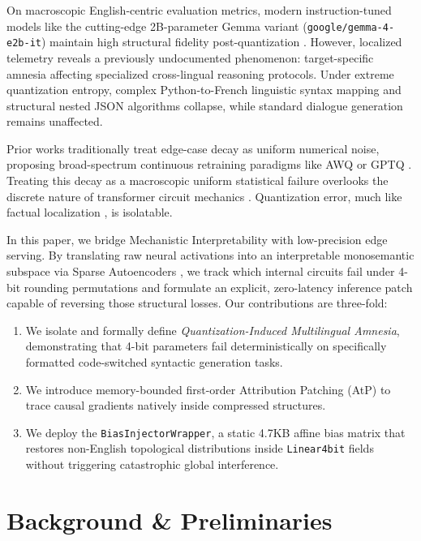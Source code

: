 \documentclass{article}
\begin{document}
On macroscopic English-centric evaluation metrics, modern instruction-tuned models like the cutting-edge 2B-parameter Gemma variant (\texttt{google/gemma-4-e2b-it}) maintain high structural fidelity post-quantization \cite{gemma2024gemma, touvron2023llama}. However, localized telemetry reveals a previously undocumented phenomenon: target-specific amnesia affecting specialized cross-lingual reasoning protocols. Under extreme quantization entropy, complex Python-to-French linguistic syntax mapping and structural nested JSON algorithms collapse, while standard dialogue generation remains unaffected.

Prior works traditionally treat edge-case decay as uniform numerical noise, proposing broad-spectrum continuous retraining paradigms like AWQ \cite{lin2023awq} or GPTQ \cite{frantar2022gptq}. Treating this decay as a macroscopic uniform statistical failure overlooks the discrete nature of transformer circuit mechanics \cite{elhage2021mathematical, olah2020zoom}. Quantization error, much like factual localization \cite{meng2022locating}, is isolatable. 

In this paper, we bridge Mechanistic Interpretability \cite{nanda2022mechanistic, bricken2023towards} with low-precision edge serving. By translating raw neural activations into an interpretable monosemantic subspace via Sparse Autoencoders \cite{lieberum2024gemmascope}, we track which internal circuits fail under 4-bit rounding permutations and formulate an explicit, zero-latency inference patch capable of reversing those structural losses. Our contributions are three-fold:
\begin{enumerate}
    \item We isolate and formally define \textit{Quantization-Induced Multilingual Amnesia}, demonstrating that 4-bit parameters fail deterministically on specifically formatted code-switched syntactic generation tasks.
    \item We introduce memory-bounded first-order Attribution Patching (AtP) to trace causal gradients natively inside compressed structures.
    \item We deploy the \texttt{BiasInjectorWrapper}, a static 4.7KB affine bias matrix that restores non-English topological distributions inside \texttt{Linear4bit} fields without triggering catastrophic global interference.
\end{enumerate}

\section{Background \& Preliminaries}
\end{document}
